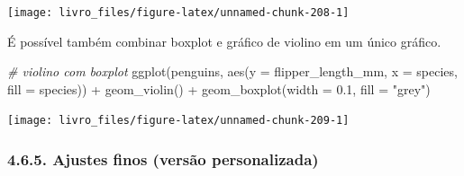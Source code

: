 \documentclass[
]{book}
\newenvironment{Shaded}{\begin{snugshade}}{\end{snugshade}}
\newcommand{\AttributeTok}[1]{\textcolor[rgb]{0.61,0.61,0.61}{#1}}
\newcommand{\CommentTok}[1]{\textcolor[rgb]{0.37,0.37,0.37}{\textit{#1}}}
\newcommand{\FloatTok}[1]{\textcolor[rgb]{0.06,0.06,0.06}{#1}}
\newcommand{\FunctionTok}[1]{\textcolor[rgb]{0,0,0}{#1}}
\newcommand{\NormalTok}[1]{#1}
\newcommand{\SpecialCharTok}[1]{\textcolor[rgb]{0,0,0}{#1}}
\newcommand{\StringTok}[1]{\textcolor[rgb]{0.5,0.5,0.5}{#1}}
\begin{document}
\begin{center}\texttt{[image: livro\_files/figure-latex/unnamed-chunk-208-1]} \end{center}

É possível também combinar boxplot e gráfico de violino em um único gráfico.

\begin{Shaded}
\begin{Highlighting}[]
\CommentTok{\# violino com boxplot}
\FunctionTok{ggplot}\NormalTok{(penguins, }\FunctionTok{aes}\NormalTok{(}\AttributeTok{y =}\NormalTok{ flipper\_length\_mm, }\AttributeTok{x =}\NormalTok{ species, }\AttributeTok{fill =}\NormalTok{ species)) }\SpecialCharTok{+}
  \FunctionTok{geom\_violin}\NormalTok{() }\SpecialCharTok{+}
  \FunctionTok{geom\_boxplot}\NormalTok{(}\AttributeTok{width =} \FloatTok{0.1}\NormalTok{, }\AttributeTok{fill =} \StringTok{"grey"}\NormalTok{)}
\end{Highlighting}
\end{Shaded}

\begin{center}\texttt{[image: livro\_files/figure-latex/unnamed-chunk-209-1]} \end{center}

\hypertarget{ajustes-finos-versuxe3o-personalizada-4}{%
\subsubsection{4.6.5. Ajustes finos (versão personalizada)}\label{ajustes-finos-versuxe3o-personalizada-4}}
\end{document}
